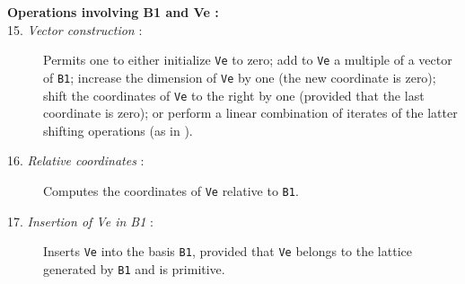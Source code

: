 \begin {description}
%
\item [{\bf Operations involving B1 and Ve :}]
\item [15. {\em Vector construction\/} :]
   Permits one to either initialize {\tt Ve} to zero; 
   add to {\tt Ve} a multiple of a vector of {\tt B1};
   increase the dimension of {\tt Ve} by one (the new coordinate is zero);
   shift the coordinates of {\tt Ve} to the right by one (provided that the
   last coordinate is zero); or perform a linear combination of iterates
   of the latter shifting operations (as in \cite{rCOU94a}).
\item [16. {\em Relative coordinates\/} :]
   Computes the coordinates of {\tt Ve} relative to {\tt B1}.
\item [17. {\em Insertion of Ve in B1\/} :]
   Inserts {\tt Ve} into the basis {\tt B1}, provided that {\tt Ve}
   belongs to the lattice generated by {\tt B1} and is primitive.
\end {description}
